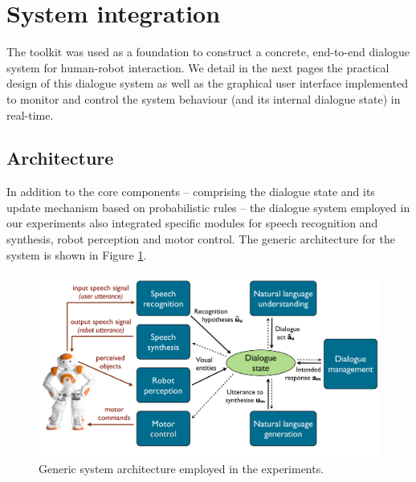 
\section{System integration}
\label{sec:system-integration}
The \opendial toolkit was used as a foundation to construct a concrete, end-to-end dialogue system for human-robot interaction.  We detail in the next pages the practical design of this dialogue system as well as the graphical user interface implemented to monitor and control the system behaviour (and its internal dialogue state) in real-time. 

\subsection{Architecture}

In addition to the \opendial core components -- comprising the dialogue state and its update mechanism based on probabilistic rules -- the dialogue system employed in our experiments also integrated specific modules for speech recognition and synthesis, robot perception and motor control.  The generic architecture for the system is shown in Figure \ref{fig:impl_architecture}. 

\begin{figure}[h]
\centering
\includegraphics[scale=0.30]{imgs/impl_architecture.pdf}
\caption{Generic system architecture employed in the experiments.}
\label{fig:impl_architecture}
\end{figure}

